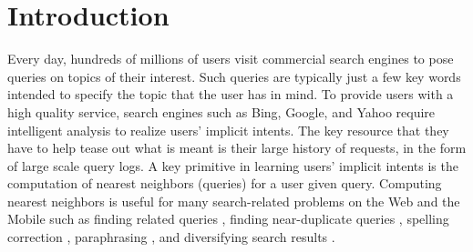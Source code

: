 
 \section{Introduction}
Every day, 
hundreds of millions of users visit commercial search engines to pose
queries on topics of their interest.  
Such queries are typically just a few key words intended to specify
the topic that the user has in mind. 
To provide users with a high quality service, 
search engines such as Bing, Google, and Yahoo require
intelligent analysis to realize users' implicit intents.
The key resource that they have to help tease out what is meant is
their large history of requests, in the form of large scale query logs.  
A key primitive in 
learning users' implicit intents is the computation of 
nearest neighbors (queries) for a user given query. 
Computing nearest neighbors is useful for 
many search-related problems on the Web and the Mobile such as 
finding related queries \cite{Jones06WWW,Jain11SIGIR,Song12WSDM}, 
finding near-duplicate queries \cite{leeCIKM11}, spelling correction \cite{ahmadEMNLP05,liSIGIR12},  
paraphrasing \cite{petrovicNAACL12,ganitkevitch13Paraphrase}, 
and diversifying search results \cite{Song11SIGIR}.  

